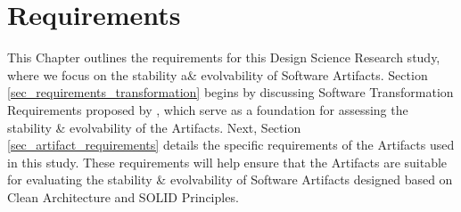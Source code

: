 \chapter{Requirements} \label{chap_requirements} 

This Chapter outlines the requirements for this Design Science Research study, where we
focus on the stability a\& evolvability of Software Artifacts. Section
\ref{sec_requirements_transformation} begins by discussing Software Transformation
Requirements proposed by \textcite{mannaert_normalized_2016}, which serve as a foundation
for assessing the stability \& evolvability of the Artifacts. Next, Section
\ref{sec_artifact_requirements} details the specific requirements of the Artifacts used in
this study. These requirements will help ensure that the Artifacts are suitable for
evaluating the stability \& evolvability of Software Artifacts designed based on Clean
Architecture and SOLID Principles.




